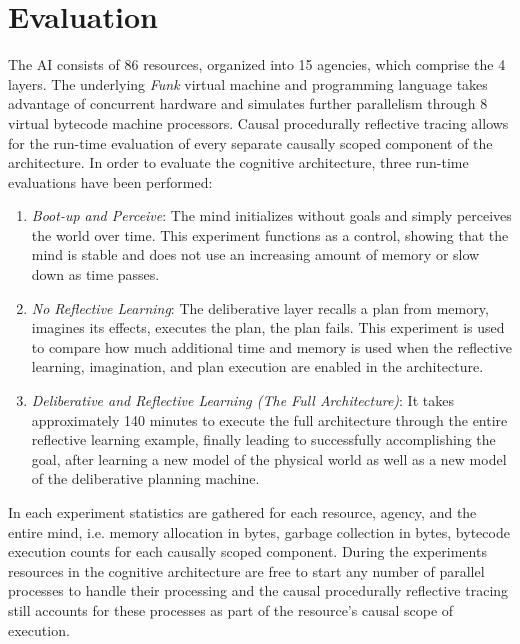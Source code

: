 \chapter{Evaluation}
\label{chapter:evaluation}

The AI consists of 86 resources, organized into 15 agencies, which
comprise the 4 layers.  The underlying \emph{Funk} virtual machine and
programming language \cite[]{morgan:2009} takes advantage of
concurrent hardware and simulates further parallelism through 8
virtual bytecode machine processors.  Causal procedurally reflective
tracing allows for the run-time evaluation of every separate causally
scoped component of the architecture.  In order to evaluate the
cognitive architecture, three run-time evaluations have been
performed:
\begin{enumerate}
\item \emph{Boot-up and Perceive}: The mind initializes without goals
  and simply perceives the world over time.  This experiment functions
  as a control, showing that the mind is stable and does not use an
  increasing amount of memory or slow down as time passes.
\item \emph{No Reflective Learning}: The deliberative layer recalls a
  plan from memory, imagines its effects, executes the plan, the plan
  fails.  This experiment is used to compare how much additional time
  and memory is used when the reflective learning, imagination, and
  plan execution are enabled in the architecture.
\item \emph{Deliberative and Reflective Learning (The Full
  Architecture)}: It takes approximately 140 minutes to execute the
  full architecture through the entire reflective learning example,
  finally leading to successfully accomplishing the goal, after
  learning a new model of the physical world as well as a new model of
  the deliberative planning machine.
\end{enumerate}

In each experiment statistics are gathered for each resource, agency,
and the entire mind, i.e. memory allocation in bytes, garbage
collection in bytes, bytecode execution counts for each causally
scoped component.  During the experiments resources in the cognitive
architecture are free to start any number of parallel processes to
handle their processing and the causal procedurally reflective tracing
still accounts for these processes as part of the resource's causal
scope of execution.

